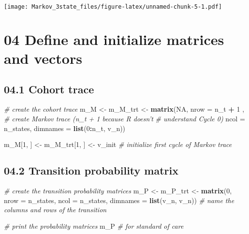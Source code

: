 \documentclass[
]{article}
\newenvironment{Shaded}{\begin{snugshade}}{\end{snugshade}}
\newcommand{\CommentTok}[1]{\textcolor[rgb]{0.56,0.35,0.01}{\textit{#1}}}
\newcommand{\DataTypeTok}[1]{\textcolor[rgb]{0.13,0.29,0.53}{#1}}
\newcommand{\DecValTok}[1]{\textcolor[rgb]{0.00,0.00,0.81}{#1}}
\newcommand{\KeywordTok}[1]{\textcolor[rgb]{0.13,0.29,0.53}{\textbf{#1}}}
\newcommand{\NormalTok}[1]{#1}
\newcommand{\OperatorTok}[1]{\textcolor[rgb]{0.81,0.36,0.00}{\textbf{#1}}}
\newcommand{\OtherTok}[1]{\textcolor[rgb]{0.56,0.35,0.01}{#1}}
\newcommand{\StringTok}[1]{\textcolor[rgb]{0.31,0.60,0.02}{#1}}
\begin{document}
\texttt{[image: Markov\_3state\_files/figure-latex/unnamed-chunk-5-1.pdf]}

\hypertarget{define-and-initialize-matrices-and-vectors}{%
\section{04 Define and initialize matrices and
vectors}\label{define-and-initialize-matrices-and-vectors}}

\hypertarget{cohort-trace}{%
\subsection{04.1 Cohort trace}\label{cohort-trace}}

\begin{Shaded}
\begin{Highlighting}[]
\CommentTok{# create the cohort trace}
\NormalTok{m_M <-}\StringTok{ }\NormalTok{m_M_trt <-}\StringTok{  }\KeywordTok{matrix}\NormalTok{(}\OtherTok{NA}\NormalTok{, }
                          \DataTypeTok{nrow =}\NormalTok{ n_t }\OperatorTok{+}\StringTok{ }\DecValTok{1}\NormalTok{ ,  }\CommentTok{# create Markov trace (n_t + 1 because R doesn't }
                                            \CommentTok{# understand Cycle 0)}
                          \DataTypeTok{ncol =}\NormalTok{ n_states, }
                          \DataTypeTok{dimnames =} \KeywordTok{list}\NormalTok{(}\DecValTok{0}\OperatorTok{:}\NormalTok{n_t, v_n))}

\NormalTok{m_M[}\DecValTok{1}\NormalTok{, ] <-}\StringTok{ }\NormalTok{m_M_trt[}\DecValTok{1}\NormalTok{, ] <-}\StringTok{ }\NormalTok{v_init          }\CommentTok{# initialize first cycle of Markov trace}
\end{Highlighting}
\end{Shaded}

\hypertarget{transition-probability-matrix}{%
\subsection{04.2 Transition probability
matrix}\label{transition-probability-matrix}}

\begin{Shaded}
\begin{Highlighting}[]
\CommentTok{# create the transition probability matrices}
\NormalTok{m_P  <-}\StringTok{ }\NormalTok{m_P_trt <-}\StringTok{ }\KeywordTok{matrix}\NormalTok{(}\DecValTok{0}\NormalTok{,}
                    \DataTypeTok{nrow =}\NormalTok{ n_states, }\DataTypeTok{ncol =}\NormalTok{ n_states,}
                    \DataTypeTok{dimnames =} \KeywordTok{list}\NormalTok{(v_n, v_n))  }\CommentTok{# name the columns and rows of the transition }
                                               
\CommentTok{# print the probability matrices }
\NormalTok{m_P      }\CommentTok{# for standard of care}
\end{Highlighting}
\end{Shaded}
\end{document}

